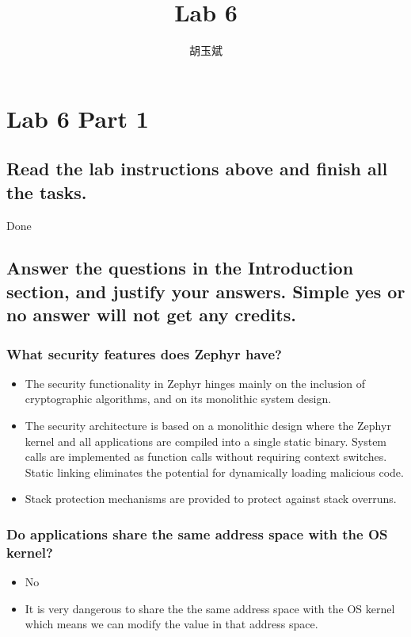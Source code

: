 \documentclass[onecolumn,oneside]{SUSTechHomework}
\author{胡玉斌}
\title{Lab 6}
\begin{document}
  \maketitle

  \section{Lab 6 Part 1}

    \subsection{Read the lab instructions above and finish all the tasks.}

    Done

    \subsection{Answer the questions in the Introduction section, and justify your answers. Simple yes or no answer will not get any credits.}

      \subsubsection{What security features does Zephyr have?}

        \begin{itemize}
          \item The security functionality in Zephyr hinges mainly on the inclusion of cryptographic algorithms, and on its monolithic system design.
          \item The security architecture is based on a monolithic design where the Zephyr kernel and all applications are compiled into a single static binary. System calls are implemented as function calls without requiring context switches. Static linking eliminates the potential for dynamically loading malicious code.
          \item Stack protection mechanisms are provided to protect against stack overruns.
        \end{itemize}

      \subsubsection{Do applications share the same address space with the OS kernel?}

        \begin{itemize}
          \item No
          \item It is very dangerous to share the the same address space with the OS kernel which means we can modify the value in that address space.
        \end{itemize}
\end{document}
